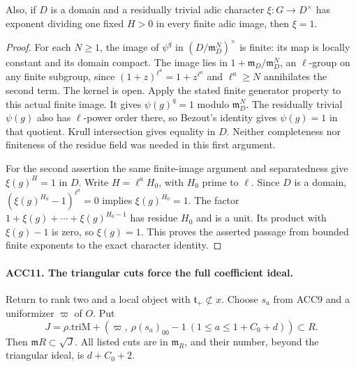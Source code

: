 \documentclass[11pt,a4paper]{article}
\numberwithin{equation}{section}
\theoremstyle{remark}\newtheorem{remark}[theorem]{Remark}
\begin{document}
Also, if \(D\) is a domain and a residually trivial adic character
\(\xi:G\to D^\times\) has exponent dividing one fixed \(H>0\)
in every finite adic image, then \(\xi=1\).

\begin{proof}
For each \(N\ge1\), the image of \(\psi^q\) in
\((D/\mathfrak m_D^N)^\times\) is finite: its map is locally
constant and its domain compact.  The image lies in \(1+
\mathfrak m_D/\mathfrak m_D^N\), an \(\ell\)-group on any
finite subgroup, since
\((1+z)^{\ell^a}=1+z^{\ell^a}\) and \(\ell^a\ge N\)
annihilates the second term.  The kernel is open.  Apply the
stated finite generator property to this actual finite image.
It gives \(\psi(g)^q=1\) modulo \(\mathfrak m_D^N\).
The residually trivial \(\psi(g)\) also has \(\ell\)-power
order there, so Bezout's identity gives \(\psi(g)=1\) in that
quotient.  Krull intersection gives equality in \(D\).
Neither completeness nor finiteness of the residue field was
needed in this first argument.

For the second assertion the same finite-image argument and
separatedness give \(\xi(g)^H=1\) in \(D\).  Write
\(H=\ell^a H_0\), with \(H_0\) prime to \(\ell\).
Since \(D\) is a domain,
\((\xi(g)^{H_0}-1)^{\ell^a}=0\) implies
\(\xi(g)^{H_0}=1\).  The factor
\(1+\xi(g)+\cdots+\xi(g)^{H_0-1}\) has residue \(H_0\)
and is a unit.  Its product with \(\xi(g)-1\) is zero, so
\(\xi(g)=1\).  This proves the asserted passage from bounded
finite exponents to the exact character identity.
\end{proof}

\paragraph{ACC11. The triangular cuts force the full coefficient ideal.}
\label{claim:ACC11}
Return to rank two and a local object with
\(\mathfrak t_+\not\subset x\).  Choose \(s_a\) from ACC9
and a uniformizer \(\varpi\) of \(O\).  Put
\[
 J=\rho.\mathrm{triM}+
       (\varpi,\ \rho(s_a)_{00}-1\ (1\le a\le1+C_0+d))
                          \subset R.                     \tag{ACC.19}
\]
Then \(\mathfrak mR\subset\sqrt J\).  All listed cuts are
in \(\mathfrak m_R\), and their number, beyond the triangular
ideal, is \(d+C_0+2\).
\end{document}
